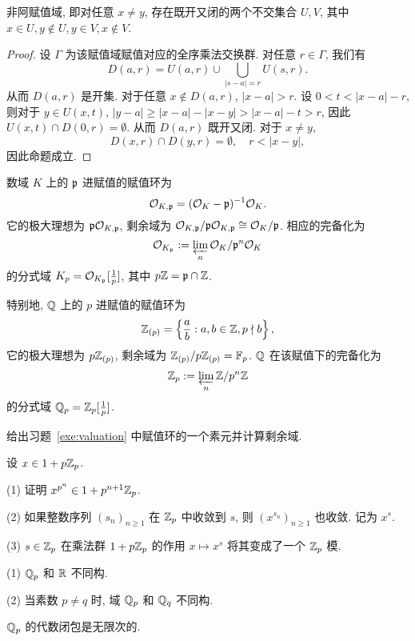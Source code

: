 \begin{proposition}{}{}
非阿赋值域, 即对任意 $x\neq y$, 存在既开又闭的两个不交集合 $U,V$, 其中 $x\in U,y\notin U, y\in V, x\notin V$.
\end{proposition}
\begin{proof}
设 $\Gamma$ 为该赋值域赋值对应的全序乘法交换群.
对任意 $r\in\Gamma$, 我们有
	\[D(a,r)=U(a,r)\cup \bigcup_{|s-a|=r}U(s,r).\]
从而 $D(a,r)$ 是开集.
对于任意 $x\notin D(a,r)$, $|x-a|>r$. 设 $0<t<|x-a|-r$, 则对于 $y\in U(x,t)$, $|y-a|\ge|x-a|-|x-y|>|x-a|-t>r$, 因此 $U(x,t)\cap D(0,r)=\emptyset$. 从而 $D(a,r)$ 既开又闭. 对于 $x\neq y$,
  \[D(x,r)\cap D(y,r)=\emptyset,\quad r<|x-y|,\]
因此命题成立.
\end{proof}


\begin{example}
数域 $K$ 上的 ${\mathfrak{p}}$ 进赋值的赋值环为
	\[{\mathcal{O}}_{K,{\mathfrak{p}}}=({\mathcal{O}}_K-{\mathfrak{p}})^{-1}{\mathcal{O}}_K.\]
它的极大理想为 ${\mathfrak{p}}{\mathcal{O}}_{K,{\mathfrak{p}}}$, 剩余域为 ${\mathcal{O}}_{K,{\mathfrak{p}}}/{\mathfrak{p}}{\mathcal{O}}_{K,{\mathfrak{p}}}\cong {\mathcal{O}}_K/{\mathfrak{p}}$. 相应的完备化为
  \[{\mathcal{O}}_{K_{\mathfrak{p}}}:=\varprojlim\limits_n {\mathcal{O}}_K/{\mathfrak{p}}^n{\mathcal{O}}_K\]
的分式域 $K_p={\mathcal{O}}_{K_{\mathfrak{p}}}[\frac{1}{p}]$, 其中 $p{\mathbb{Z}}={\mathfrak{p}}\cap {\mathbb{Z}}$.

特别地, ${\mathbb{Q}}$ 上的 $p$ 进赋值的赋值环为 
  \[{\mathbb{Z}}_{(p)}=\left\{\frac{a}{b}: a,b\in{\mathbb{Z}},p\nmid b\right\},\]
它的极大理想为 $p{\mathbb{Z}}_{(p)}$, 剩余域为 ${\mathbb{Z}}_{(p)}/p{\mathbb{Z}}_{(p)}={\mathbb{F}}_p$. ${\mathbb{Q}}$ 在该赋值下的完备化为
  \[{\mathbb{Z}}_p:=\varprojlim\limits_n {\mathbb{Z}}/p^n{\mathbb{Z}}\]
的分式域 ${\mathbb{Q}}_p={\mathbb{Z}}_p[\frac{1}{p}]$.
\end{example}

\begin{exercise}
给出习题~\ref{exe:valuation} 中赋值环的一个素元并计算剩余域.
\end{exercise}

\begin{exercise}
设 $x\in 1+p{\mathbb{Z}}_p$.

(1) 证明 $x^{p^n}\in 1+p^{n+1}{\mathbb{Z}}_p$.

(2) 如果整数序列 $(s_n)_{n\ge 1}$ 在 ${\mathbb{Z}}_p$ 中收敛到 $s$, 则 $(x^{s_n})_{n\ge 1}$ 也收敛. 记为 $x^s$.

(3) $s\in{\mathbb{Z}}_p$ 在乘法群 $1+p{\mathbb{Z}}_p$ 的作用 $x\mapsto x^s$ 将其变成了一个 ${\mathbb{Z}}_p$ 模.
\end{exercise}

\begin{exercise}
(1) ${\mathbb{Q}}_p$ 和 ${\mathbb{R}}$ 不同构.

(2) 当素数 $p\neq q$ 时, 域 ${\mathbb{Q}}_p$ 和 ${\mathbb{Q}}_q$ 不同构.
\end{exercise}

\begin{exercise}
${\mathbb{Q}}_p$ 的代数闭包是无限次的.
\end{exercise}



